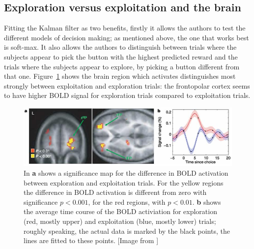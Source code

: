 \documentclass[12pt]{article}
\begin{document}
\subsection*{Exploration versus exploitation and the brain}

Fitting the Kalman filter as two benefits, firstly it allows the
authors to test the different models of decision making; as mentioned
above, the one that works best is soft-max. It also allows the authors
to distinguish between trials where the subjects appear to pick the
button with the highest predicted reward and the trials where the
subjects appear to explore, by picking a button different from that
one. Figure~\ref{fig_fmri_eve} shows the brain region which activates
distinguishes most strongly between exploitation and exploration
trials: the frontopolar cortex seems to have higher BOLD signal for
exploration trials compared to exploitation trials.


\begin{figure}[htb]
\begin{center}
\includegraphics[width=12cm]{fig_fmri_eve.jpg}
\end{center}
\caption{In \textbf{a} shows a significance map for the difference in
  BOLD activation between exploration and exploitation trials. For the
  yellow regions the difference in BOLD activation is different from
  zero with significance $p<0.001$, for the red regions, with
  $p<0.01$. \textbf{b} shows the average time course of the BOLD
  activiation for exploration (red, mostly upper) and exploitation
  (blue, mostly lower) trials; roughly speaking, the actual data is
  marked by the black points, the lines are fitted to these
  points. [Image from \citep{DawEtAl2006}]\label{fig_fmri_eve}}
\end{figure}





 {}
\end{document}
